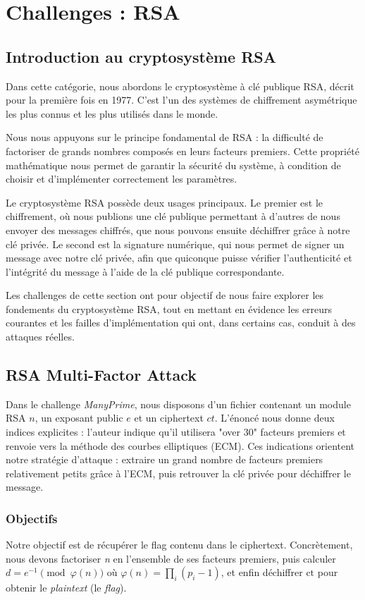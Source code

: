 
\section{Challenges : RSA}
\subsection{Introduction au cryptosystème RSA}
Dans cette catégorie, nous abordons le cryptosystème à clé publique RSA, décrit pour la première fois en 1977. C’est l’un des systèmes de chiffrement asymétrique les plus connus et les plus utilisés dans le monde.

Nous nous appuyons sur le principe fondamental de RSA : la difficulté de factoriser de grands nombres composés en leurs facteurs premiers. Cette propriété mathématique nous permet de garantir la sécurité du système, à condition de choisir et d’implémenter correctement les paramètres.

Le cryptosystème RSA possède deux usages principaux. Le premier est le chiffrement, où nous publions une clé publique permettant à d’autres de nous envoyer des messages chiffrés, que nous pouvons ensuite déchiffrer grâce à notre clé privée. Le second est la signature numérique, qui nous permet de signer un message avec notre clé privée, afin que quiconque puisse vérifier l’authenticité et l’intégrité du message à l’aide de la clé publique correspondante.

Les challenges de cette section ont pour objectif de nous faire explorer les fondements du cryptosystème RSA, tout en mettant en évidence les erreurs courantes et les failles d’implémentation qui ont, dans certains cas, conduit à des attaques réelles.


\subsection{RSA Multi-Factor Attack}
Dans le challenge \textit{ManyPrime}, nous disposons d’un fichier contenant un module RSA $n$, un exposant public $e$ et un ciphertext $ct$. L’énoncé nous donne deux indices explicites : l’auteur indique qu’il utilisera "over 30" facteurs premiers et renvoie vers la méthode des courbes elliptiques (ECM). Ces indications orientent notre stratégie d’attaque : extraire un grand nombre de facteurs premiers relativement petits grâce à l’ECM, puis retrouver la clé privée pour déchiffrer le message.


\subsubsection{Objectifs}
Notre objectif est de récupérer le flag contenu dans le ciphertext. Concrètement, nous devons factoriser \textit{n} en l’ensemble de ses facteurs premiers, puis calculer $d = e^{-1} \pmod{\varphi(n)}$ où $\varphi(n)=\prod_i (p_i-1)$, et enfin déchiffrer $\mathrm{ct}$ pour obtenir le \textit{plaintext} (le \textit{flag}).


